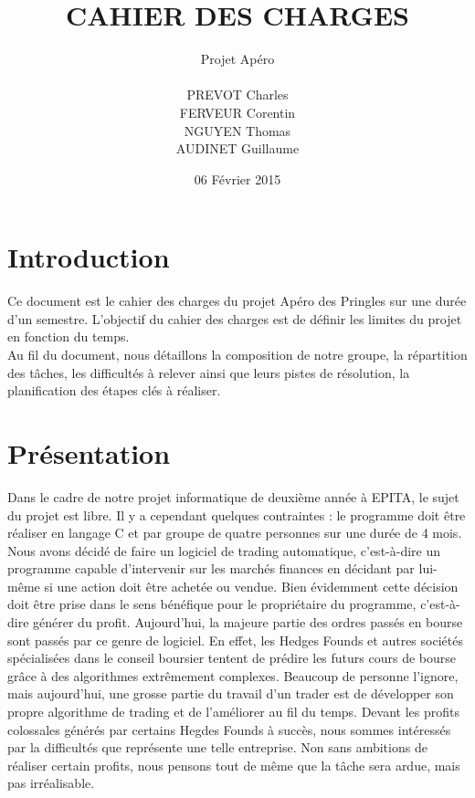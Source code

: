 \documentclass[a4paper,12pt]{article}
\title{CAHIER DES CHARGES}
\author{Projet Apéro \\ \\ PREVOT Charles \\ FERVEUR Corentin \\ NGUYEN Thomas \\ AUDINET Guillaume}
\date{06 Février 2015}
\begin{document}
\begin{titlepage}
\maketitle
\end{titlepage}

\tableofcontents
\newpage

\section{Introduction}
Ce document est le cahier des charges du projet Apéro des Pringles sur une durée d'un semestre.
L'objectif du cahier des charges est de définir les limites du projet en fonction du temps. \\

Au fil du document, nous détaillons la composition de notre groupe, la répartition des tâches, les difficultés à relever ainsi que leurs pistes de résolution, la planification des étapes clés à réaliser.\\

\section{Présentation}
Dans le cadre de notre projet informatique de deuxième année à EPITA, le sujet du projet est libre. Il y a cependant quelques contraintes : le programme doit être réaliser en langage C et par groupe de quatre personnes sur une durée de 4 mois. Nous avons décidé de faire un logiciel de trading automatique, c'est-à-dire un programme capable d'intervenir sur les marchés finances en décidant par lui-même si une action doit être achetée ou vendue. Bien évidemment cette décision doit être prise dans le sens bénéfique pour le propriétaire du programme, c'est-à-dire générer du profit. Aujourd'hui, la majeure partie des ordres passés en bourse sont passés par ce genre de logiciel. En effet, les Hedges Founds et autres sociétés spécialisées dans le conseil boursier tentent de prédire les futurs cours de bourse grâce à des algorithmes extrêmement complexes. Beaucoup de personne l'ignore, mais aujourd'hui, une grosse partie du travail d'un trader est de développer son propre algorithme de trading et de l'améliorer au fil du temps. Devant les profits colossales générés par certains Hegdes Founds à succès, nous sommes intéressés par la difficultés que représente une telle entreprise. Non sans ambitions de réaliser certain profits, nous pensons tout de même que la tâche sera ardue, mais pas irréalisable.
\end{document}
